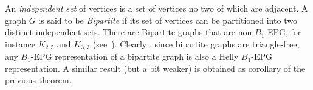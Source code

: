 \documentclass[9pt]{entcs}
\newtheorem{coro}[thm]{Corollary}%
\begin{document}
\begin{pf}
\end{pf}  







An \textit{independent set} of vertices is a set of vertices no two of which are adjacent.
A graph $G$ is said to be \textit{Bipartite} if its set of vertices can be partitioned into two distinct independent sets.
 There are Bipartite graphs that are non $B_1$-EPG, for instance $K_{2,5}$ and $K_{3,3}$ (see~\cite{cohen2014}). Clearly , since
 bipartite graphs are triangle-free, any $B_1$-EPG representation of a bipartite graph is also a Helly $B_1$-EPG representation.
 A similar result (but a bit weaker) is obtained as corollary of the previous theorem. 
 
\end{document}
